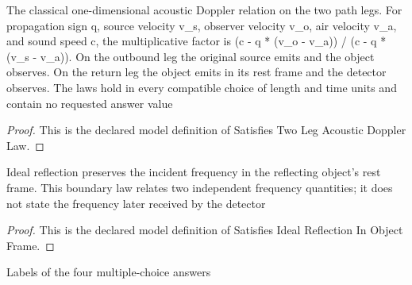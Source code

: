 \begin{definition}
  \label{def:physics:phyx-mini-0214:phyxminiproblems-problemphyxmini0214-satisfiestwolegacousticdopplerlaw}
  The classical one-dimensional acoustic Doppler relation on the two path legs. For propagation sign q, source velocity v\_s, observer velocity v\_o, air velocity v\_a, and sound speed c, the multiplicative factor is (c - q * (v\_o - v\_a)) / (c - q * (v\_s - v\_a)). On the outbound leg the original source emits and the object observes. On the return leg the object emits in its rest frame and the detector observes. The laws hold in every compatible choice of length and time units and contain no requested answer value
\end{definition}
\begin{proof}
  This is the declared model definition of Satisfies Two Leg Acoustic Doppler Law.
\end{proof}
\begin{definition}
  \label{def:physics:phyx-mini-0214:phyxminiproblems-problemphyxmini0214-satisfiesidealreflectioninobjectframe}
  Ideal reflection preserves the incident frequency in the reflecting object's rest frame. This boundary law relates two independent frequency quantities; it does not state the frequency later received by the detector
\end{definition}
\begin{proof}
  This is the declared model definition of Satisfies Ideal Reflection In Object Frame.
\end{proof}
\begin{definition}
  \label{def:physics:phyx-mini-0214:phyxminiproblems-problemphyxmini0214-answerchoice}
  Labels of the four multiple-choice answers
\end{definition}
